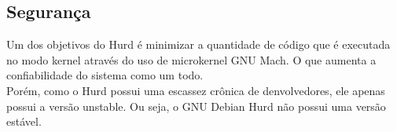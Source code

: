 \documentclass[conference]{IEEEtran}
\begin{document}
\subsection{Segurança}\label{sec:HurdSec}
Um dos objetivos do Hurd é minimizar a quantidade de código que é executada no modo kernel através do uso de microkernel GNU Mach. O que aumenta a confiabilidade do sistema como um todo.\\

Porém, como o Hurd possui uma escassez crônica de denvolvedores, ele apenas possui a versão unstable. Ou seja, o GNU Debian Hurd não possui uma versão estável.



\end{document}
